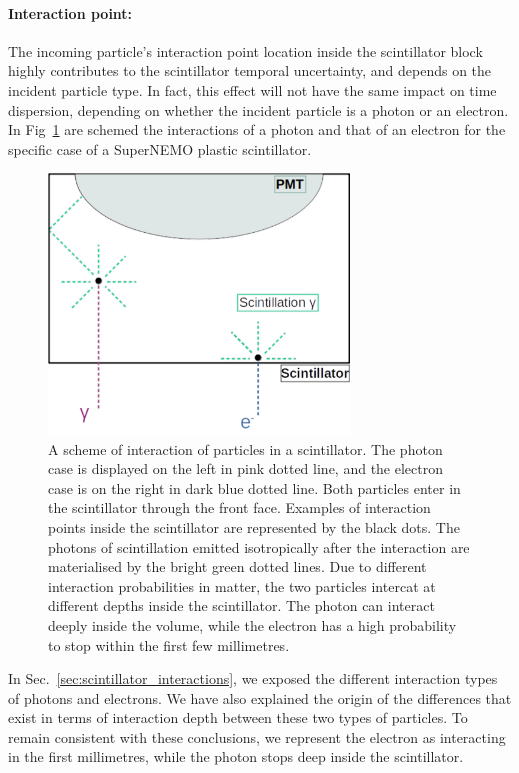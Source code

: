 \paragraph{Interaction point:}
The incoming particle's interaction point location inside the scintillator block highly contributes to the scintillator temporal uncertainty, and depends on the incident particle type.
In fact, this effect will not have the same impact on time dispersion, depending on whether the incident particle is a photon or an electron.
In Fig~\ref{fig:photon_scintilator} are schemed the interactions of a photon and that of an electron for the specific case of a SuperNEMO plastic scintillator.
\begin{figure}[h]
  \centering
  \includegraphics[width=8cm]{commissioning/fig_commissioning/Co_multi_reflection.pdf}
  \caption{A scheme of interaction of particles in a scintillator.
    The photon case is displayed on the left in pink dotted line, and the electron case is on the right in dark blue dotted line.
    Both particles enter in the scintillator through the front face.
    Examples of interaction points inside the scintillator are represented by the black dots.
    The photons of scintillation emitted isotropically after the interaction are materialised by the bright green dotted lines.
    Due to different interaction probabilities in matter, the two particles intercat at different depths inside the scintillator.
    The photon can interact deeply inside the volume, while the electron has a high probability to stop within the first few millimetres.
    \label{fig:photon_scintilator}}
\end{figure}
In Sec.~\ref{sec:scintillator_interactions}, we exposed the different interaction types of photons and electrons.
We have also explained the origin of the differences that exist in terms of interaction depth between these two types of particles.
To remain consistent with these conclusions, we represent the electron as interacting in the first millimetres, while the photon stops deep inside the scintillator.
